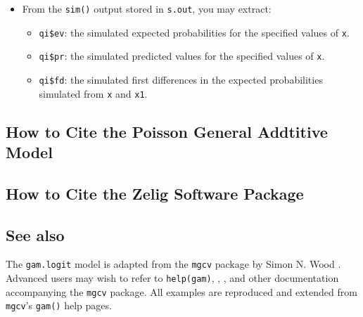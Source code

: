 \begin{itemize}
\item From the {\tt sim()} output stored in {\tt s.out}, you may extract:
\begin{itemize}
\item {\tt qi\$ev}: the simulated expected probabilities for the specified values of {\tt x}.
\item {\tt qi\$pr}: the simulated predicted values for the specified values of {\tt x}.
\item {\tt qi\$fd}: the simulated first differences in the expected probabilities simulated from {\tt x} and {\tt x1}.
\end{itemize}
\end{itemize}

\subsection*{How to Cite the Poisson General Addtitive Model}

\subsection*{How to Cite the Zelig Software Package}
\CiteZelig

\subsection* {See also}
The {\tt gam.logit} model is adapted from the  {\tt mgcv} package by Simon N. Wood \citep{Wood06}. Advanced users may wish to refer to {\tt help(gam)},  \cite{Wood04}, \cite{Wood00}, and other documentation accompanying the {\tt mgcv} package. All examples are reproduced and extended from {\tt mgcv}'s {\tt gam()} help pages.



